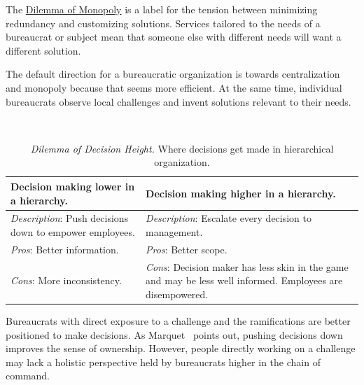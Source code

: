 The \hyperref[table:market-vs-monopoly]{Dilemma of Monopoly} is a label for the tension between minimizing redundancy and customizing solutions. Services tailored to the needs of a bureaucrat or subject mean that someone else with different needs will want a different solution. 


The default direction for a bureaucratic organization is towards centralization and monopoly because that seems more efficient. At the same time, individual bureaucrats observe local challenges and invent solutions relevant to their needs.


\ \\

\begin{center}
\begin{table}[H] %
\begin{tabular}{ | m{\dilemmatablewidth}| m{\dilemmatablewidth} | } 
  \hline
  \textbf{Decision making lower in a hierarchy.} &
  \textbf{Decision making higher in a hierarchy.} \\
  \hline
  \textit{Description}: Push decisions down to empower employees. &
  \textit{Description}: Escalate every decision to management. \\  
  \hline
  \textit{Pros}: Better information. &
  \textit{Pros}: Better scope. \\
  \hline
  \textit{Cons}: More inconsistency. & 
  \textit{Cons}: Decision maker has less skin in the game and may be less well informed. Employees are disempowered. \\
  \hline
\end{tabular}
\caption{
\textit{Dilemma of Decision Height.}
Where decisions get made in hierarchical organization.
}
\label{table:decisions-low-vs-high}
\end{table}
\end{center}

Bureaucrats with direct exposure to a challenge and the ramifications are better positioned to make decisions. As Marquet~\cite{2013_Marquet} points out, pushing decisions down improves the sense of ownership. However, people directly working on a challenge may lack a holistic perspective held by bureaucrats higher in the chain of command. 

